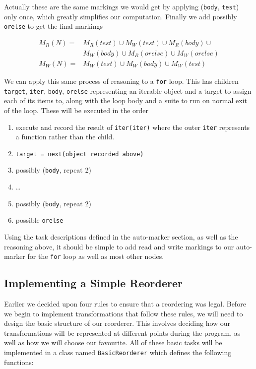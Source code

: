 \documentclass[twoside,a4paper]{report}
\begin{document}
Actually these are the same markings we would get by applying (\texttt{body}, \texttt{test}) only once, which greatly simplifies our computation. Finally we
add possibly \texttt{orelse} to get the final markings

\begin{align*}
M_R(N) =& M_R(test) \cup M_W(test) \cup M_R(body) \cup \\
        & M_W(body) \cup M_R(orelse) \cup M_W(orelse) \\
M_W(N) =& M_W(test) \cup M_W(body) \cup M_W(test)
\end{align*}

We can apply this same process of reasoning to a \texttt{for} loop. This has children \texttt{target}, \texttt{iter}, \texttt{body}, \texttt{orelse}
representing an iterable object and a target to assign each of its items to, along with the loop body and a suite to run on normal exit of the loop.
These will be executed in the order

\begin{enumerate}
\item execute and record the result of \texttt{iter(iter)} where the outer \texttt{iter} represents a function rather than the child.
\item \texttt{target = next(object recorded above)}
\item possibly (\texttt{body}, repeat 2)
\item \ldots
\item possibly (\texttt{body}, repeat 2)
\item possible \texttt{orelse}
\end{enumerate}

Using the task descriptions defined in the auto-marker section, as well as the reasoning above, it should be simple to add read and write markings to
our auto-marker for the \texttt{for} loop as well as most other nodes.

\subsection{Implementing a Simple Reorderer}

Earlier we decided upon four rules to ensure that a reordering was legal. Before we begin to implement transformations that follow these rules, we
will need to design the basic structure of our reorderer. This involves deciding how our transformations will be represented at different points
during the program, as well as how we will choose our favourite. All of these basic tasks will be implemented in a class named \texttt{BasicReorderer}
which defines the following functions:
\end{document}
